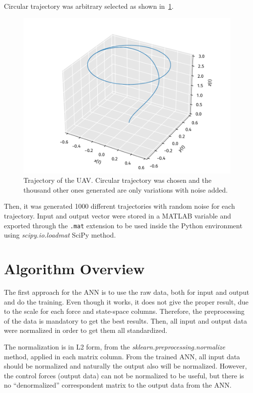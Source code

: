 Circular trajectory was arbitrary selected as shown in~\cref{fig:trajectory}.
\begin{figure}[!htb]
    \centering
    \caption[Trajectory of the UAV]{Trajectory of the UAV. Circular trajectory was chosen and the thousand other ones generated are only variations with noise added.}
    \includegraphics{../codes/models/model_alpha/figures/trajectory.pdf}
    
    \label{fig:trajectory}
\end{figure}
Then, it was generated 1000 different trajectories with random noise for each trajectory.
Input and output vector were stored in a MATLAB variable and exported through the \texttt{.mat} extension to be used inside the Python environment using \emph{scipy.io.loadmat} SciPy method.


\section{Algorithm Overview}

The first approach for the ANN is to use the raw data, both for input and output and do the training.
Even though it works, it does not give the proper result, due to the scale for each force and state-space columns.
Therefore, the preprocessing of the data is mandatory to get the best results.
Then, all input and output data were normalized in order to get them all standardized.

The normalization is in L2 form, from the \emph{sklearn.preprocessing.normalize} method, applied in each matrix column.
From the trained ANN, all input data should be normalized and naturally the output also will be normalized.
However, the control forces (output data) can not be normalized to be useful, but there is no ``denormalized'' correspondent matrix to the output data from the ANN.

